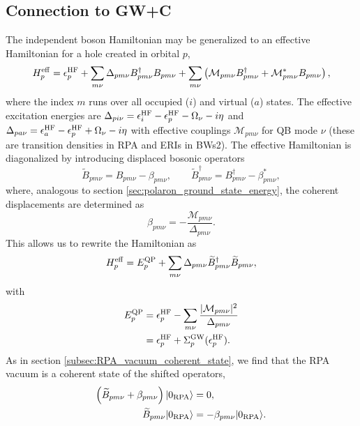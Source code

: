 \subsection{Connection to GW+C}
The independent boson Hamiltonian may be generalized to an effective Hamiltonian for a hole created in orbital $p$,
\begin{equation}
H_p^{\rm eff}
=
\epsilon_p^{\rm HF}
+
\sum_{m\nu}
\Delta_{pm\nu}
B_{pm\nu}^{\dagger}
B_{pm\nu}
+
\sum_{m\nu}
\left(
\mathcal{M}_{pm\nu}
B_{pm\nu}^{\dagger}
+
\mathcal{M}_{pm\nu}^{*}
B_{pm\nu}
\right),
\label{eq:Heff}
\end{equation}
where the index $m$ runs over all occupied ($i$) and virtual ($a$) states. The effective excitation energies are $\Delta_{pi\nu}
=
\epsilon_i^{\rm HF}
-
\epsilon_p^{\rm HF}
-
\Omega_\nu -i\eta$ and
$
\Delta_{pa\nu}
=
\epsilon_a^{\rm HF}
-
\epsilon_p^{\rm HF}
+
\Omega_\nu -i\eta
$ with effective couplings $\mathcal{M}_{pm\nu}$ for QB mode $\nu$ (these are transition densities in RPA and ERIs in BWs2). The effective Hamiltonian is diagonalized by introducing displaced bosonic operators
\begin{equation}
\widetilde B_{pm\nu}
=
B_{pm\nu}
-
\beta_{pm\nu},
\qquad
\widetilde B_{pm\nu}^{\dagger}
=
B_{pm\nu}^{\dagger}
-
\beta_{pm\nu}^{*},
\end{equation}
where, analogous to section \ref{sec:polaron_ground_state_energy}, the coherent displacements are determined as
\begin{equation}
\beta_{pm\nu}
=
-
\frac{\mathcal{M}_{pm\nu}}
{\Delta_{pm\nu}}.
\end{equation}
This allows us to rewrite the Hamiltonian as
\begin{equation}
H_p^{\rm eff}
=
E_p^{\rm QP}
+
\sum_{m\nu}
\Delta_{pm\nu}
\widetilde B_{pm\nu}^{\dagger}
\widetilde B_{pm\nu},
\end{equation}
with
\begin{align}
E_p^{\rm QP}
&=
\epsilon_p^{\rm HF}
-
\sum_{m\nu}
\frac{|\mathcal{M}_{pm\nu}|^2}
{\Delta_{pm\nu}}
\\
&=
\epsilon_p^{\rm HF}
+ \Sigma_p^{\rm GW}(\epsilon_p^{\rm HF}).
\end{align}
As in section \ref{subsec:RPA_vacuum_coherent_state}, we find that the RPA vacuum is a coherent state of the shifted operators,
\begin{align}
\left(
\widetilde B_{pm\nu}
+
\beta_{pm\nu}
\right)
|0_{\rm RPA}\rangle
&=
0,
\\
\widetilde B_{pm\nu}
|0_{\rm RPA}\rangle
&=
-
\beta_{pm\nu}
|0_{\rm RPA}\rangle.
\end{align}
